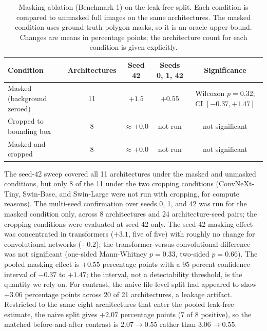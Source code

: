 \documentclass{melba}
\begin{document}
\begin{table}[t]
\centering
\caption{Masking ablation (Benchmark 1) on the leak-free split. Each condition is compared to unmasked full images on the same architectures. The masked condition uses ground-truth polygon masks, so it is an oracle upper bound. Changes are means in percentage points; the architecture count for each condition is given explicitly.}
\small
\begin{tabular}{|l|c|c|c|c|}
\hline
Condition & Architectures & Seed 42 & Seeds 0, 1, 42 & Significance \\
\hline
Masked (background zeroed) & 11 & $+1.5$ & $+0.55$ & Wilcoxon $p=0.32$; CI $[-0.37,+1.47]$ \\
Cropped to bounding box & 8 & $\approx +0.0$ & not run & not significant \\
Masked and cropped & 8 & $\approx +0.0$ & not run & not significant \\
\hline
\end{tabular}

\vspace{2mm}
\parbox{0.95\textwidth}{\footnotesize The seed-42 sweep covered all 11 architectures under the masked and unmasked conditions, but only 8 of the 11 under the two cropping conditions (ConvNeXt-Tiny, Swin-Base, and Swin-Large were not run with cropping, for compute reasons). The multi-seed confirmation over seeds 0, 1, and 42 was run for the masked condition only, across 8 architectures and 24 architecture-seed pairs; the cropping conditions were evaluated at seed 42 only. The seed-42 masking effect was concentrated in transformers ($+3.1$, five of five) with roughly no change for convolutional networks ($+0.2$); the transformer-versus-convolutional difference was not significant (one-sided Mann-Whitney $p=0.33$, two-sided $p=0.66$). The pooled masking effect is $+0.55$ percentage points with a 95 percent confidence interval of $-0.37$ to $+1.47$; the interval, not a detectability threshold, is the quantity we rely on. For contrast, the naive file-level split had appeared to show $+3.06$ percentage points across 20 of 21 architectures, a leakage artifact. Restricted to the same eight architectures that enter the pooled leak-free estimate, the naive split gives $+2.07$ percentage points (7 of 8 positive), so the matched before-and-after contrast is $2.07 \rightarrow 0.55$ rather than $3.06 \rightarrow 0.55$.}
\label{tab:mask}
\end{table}
\end{document}
